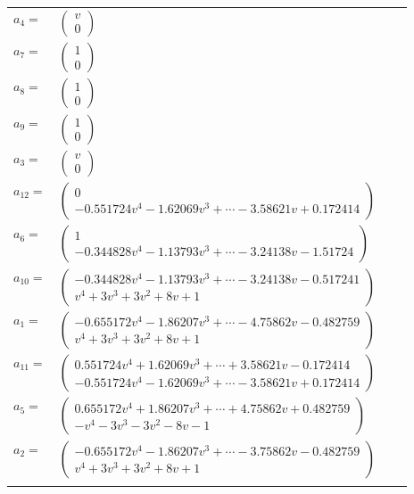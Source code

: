 \documentclass[1p]{elsarticle_modified}
\theoremstyle{definition}
\begin{document}
\begin{tabular}{m{7pt} m{180pt} m{7pt} m{180pt} }
\flushright $a_{4}=$&$\begin{pmatrix}v\\0\end{pmatrix}$ \\
\flushright $a_{7}=$&$\begin{pmatrix}1\\0\end{pmatrix}$ \\
\flushright $a_{8}=$&$\begin{pmatrix}1\\0\end{pmatrix}$ \\
\flushright $a_{9}=$&$\begin{pmatrix}1\\0\end{pmatrix}$ \\
\flushright $a_{3}=$&$\begin{pmatrix}v\\0\end{pmatrix}$ \\
\flushright $a_{12}=$&$\begin{pmatrix}0\\-0.551724 v^{4}-1.62069 v^{3}+\cdots-3.58621 v+0.172414\end{pmatrix}$ \\
\flushright $a_{6}=$&$\begin{pmatrix}1\\-0.344828 v^{4}-1.13793 v^{3}+\cdots-3.24138 v-1.51724\end{pmatrix}$ \\
\flushright $a_{10}=$&$\begin{pmatrix}-0.344828 v^{4}-1.13793 v^{3}+\cdots-3.24138 v-0.517241\\v^4+3 v^3+3 v^2+8 v+1\end{pmatrix}$ \\
\flushright $a_{1}=$&$\begin{pmatrix}-0.655172 v^{4}-1.86207 v^{3}+\cdots-4.75862 v-0.482759\\v^4+3 v^3+3 v^2+8 v+1\end{pmatrix}$ \\
\flushright $a_{11}=$&$\begin{pmatrix}0.551724 v^{4}+1.62069 v^{3}+\cdots+3.58621 v-0.172414\\-0.551724 v^{4}-1.62069 v^{3}+\cdots-3.58621 v+0.172414\end{pmatrix}$ \\
\flushright $a_{5}=$&$\begin{pmatrix}0.655172 v^{4}+1.86207 v^{3}+\cdots+4.75862 v+0.482759\\- v^4-3 v^3-3 v^2-8 v-1\end{pmatrix}$ \\
\flushright $a_{2}=$&$\begin{pmatrix}-0.655172 v^{4}-1.86207 v^{3}+\cdots-3.75862 v-0.482759\\v^4+3 v^3+3 v^2+8 v+1\end{pmatrix}$\\&\end{tabular}
\end{document}
